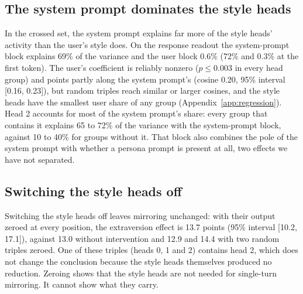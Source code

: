 \subsection{The system prompt dominates the style heads}
\label{sec:res-regression}

In the crossed set, the system prompt explains far more of the style heads' activity than the user's style does. On the response readout the system-prompt block explains 69\% of the variance and the user block 0.6\% (72\% and 0.3\% at the first token). The user's coefficient is reliably nonzero ($p \le 0.003$ in every head group) and points partly along the system prompt's (cosine 0.20, 95\% interval [0.16, 0.23]), but random triples reach similar or larger cosines, and the style heads have the smallest user share of any group (Appendix~\ref{app:regression}). Head 2 accounts for most of the system prompt's share: every group that contains it explains 65 to 72\% of the variance with the system-prompt block, against 10 to 40\% for groups without it. That block also combines the pole of the system prompt with whether a persona prompt is present at all, two effects we have not separated.

\subsection{Switching the style heads off}
\label{sec:res-zeroing}

Switching the style heads off leaves mirroring unchanged: with their output zeroed at every position, the extraversion effect is 13.7 points (95\% interval [10.2, 17.1]), against 13.0 without intervention and 12.9 and 14.4 with two random triples zeroed. One of these triples (heads 0, 1 and 2) contains head 2, which does not change the conclusion because the style heads themselves produced no reduction. Zeroing shows that the style heads are not needed for single-turn mirroring. It cannot show what they carry.

